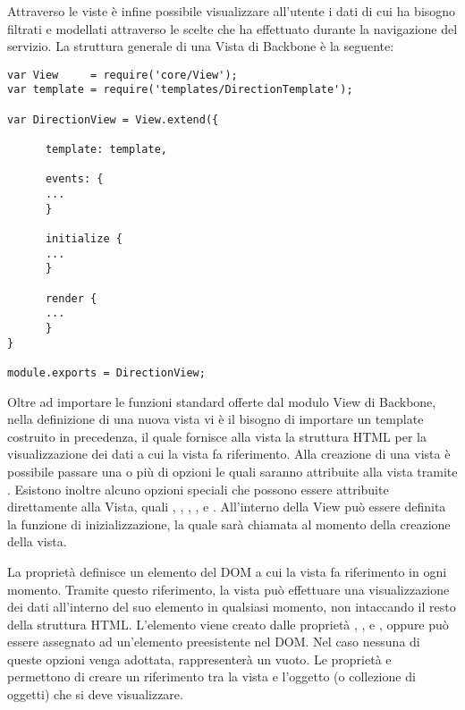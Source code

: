 Attraverso le viste è infine possibile visualizzare all'utente i dati di cui ha bisogno filtrati e modellati attraverso le scelte che ha effettuato durante la navigazione del servizio.
La struttura generale di una Vista di Backbone è la seguente:

\begin{lstlisting}
var View     = require('core/View');
var template = require('templates/DirectionTemplate');

var DirectionView = View.extend({
      
      template: template,

      events: {
      ...
      }

      initialize {
      ...
      }

      render {
      ...
      }
}

module.exports = DirectionView;
\end{lstlisting}


Oltre ad importare le funzioni standard offerte dal modulo View di Backbone, nella definizione di una nuova vista vi è il bisogno di importare un template costruito in precedenza, il quale fornisce alla vista la struttura HTML per la visualizzazione dei dati a cui la vista fa riferimento.
Alla creazione di una vista è possibile passare una o più di opzioni le quali saranno attribuite alla vista tramite . Esistono inoltre alcuno opzioni speciali che possono essere attribuite direttamente alla Vista, quali , , , ,   e . All'interno della View può essere definita la funzione di inizializzazione, la quale sarà chiamata al momento della creazione della vista.

La proprietà  definisce un elemento del DOM a cui la vista fa riferimento in ogni momento. Tramite questo riferimento, la vista può effettuare una visualizzazione dei dati all'interno del suo elemento  in qualsiasi momento, non intaccando il resto della struttura HTML. L'elemento  viene creato dalle proprietà , ,  e , oppure può essere assegnato ad un'elemento preesistente nel DOM. Nel caso nessuna di queste opzioni venga adottata,  rappresenterà un  vuoto.
Le proprietà  e  permettono di creare un riferimento tra la vista e l'oggetto (o collezione di oggetti) che si deve visualizzare.

